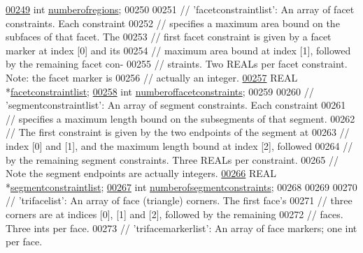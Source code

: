 \begin{DoxyCode}
\hypertarget{tetgen_8h_source.tex_l00249}{}\hyperlink{classtetgenio_a0394c99b57c4412515183ada3c1d8951}{00249}   \textcolor{keywordtype}{int} \hyperlink{classtetgenio_a0394c99b57c4412515183ada3c1d8951}{numberofregions};
00250 
00251   \textcolor{comment}{// 'facetconstraintlist':  An array of facet constraints.  Each constraint}
00252   \textcolor{comment}{//   specifies a maximum area bound on the subfaces of that facet.  The}
00253   \textcolor{comment}{//   first facet constraint is given by a facet marker at index [0] and its}
00254   \textcolor{comment}{//   maximum area bound at index [1], followed by the remaining facet con-}
00255   \textcolor{comment}{//   straints. Two REALs per facet constraint.  Note: the facet marker is}
00256   \textcolor{comment}{//   actually an integer.}
\hypertarget{tetgen_8h_source.tex_l00257}{}\hyperlink{classtetgenio_aabfef9df7956218bcb98ee39f1a9814b}{00257}   REAL *\hyperlink{classtetgenio_aabfef9df7956218bcb98ee39f1a9814b}{facetconstraintlist};
\hypertarget{tetgen_8h_source.tex_l00258}{}\hyperlink{classtetgenio_acd7176cc55338187a391016acfb53913}{00258}   \textcolor{keywordtype}{int} \hyperlink{classtetgenio_acd7176cc55338187a391016acfb53913}{numberoffacetconstraints};
00259 
00260   \textcolor{comment}{// 'segmentconstraintlist': An array of segment constraints. Each constraint }
00261   \textcolor{comment}{//   specifies a maximum length bound on the subsegments of that segment.}
00262   \textcolor{comment}{//   The first constraint is given by the two endpoints of the segment at}
00263   \textcolor{comment}{//   index [0] and [1], and the maximum length bound at index [2], followed}
00264   \textcolor{comment}{//   by the remaining segment constraints.  Three REALs per constraint. }
00265   \textcolor{comment}{//   Note the segment endpoints are actually integers.}
\hypertarget{tetgen_8h_source.tex_l00266}{}\hyperlink{classtetgenio_ab63298ebb6904d1dfa8ddebb13440ef7}{00266}   REAL *\hyperlink{classtetgenio_ab63298ebb6904d1dfa8ddebb13440ef7}{segmentconstraintlist};
\hypertarget{tetgen_8h_source.tex_l00267}{}\hyperlink{classtetgenio_a56142dec4914ffaaf5093c4aaa23b7d4}{00267}   \textcolor{keywordtype}{int} \hyperlink{classtetgenio_a56142dec4914ffaaf5093c4aaa23b7d4}{numberofsegmentconstraints};
00268 
00269 
00270   \textcolor{comment}{// 'trifacelist':  An array of face (triangle) corners.  The first face's}
00271   \textcolor{comment}{//   three corners are at indices [0], [1] and [2], followed by the remaining}
00272   \textcolor{comment}{//   faces.  Three ints per face.}
00273   \textcolor{comment}{// 'trifacemarkerlist':  An array of face markers; one int per face.}

\end{DoxyCode}
